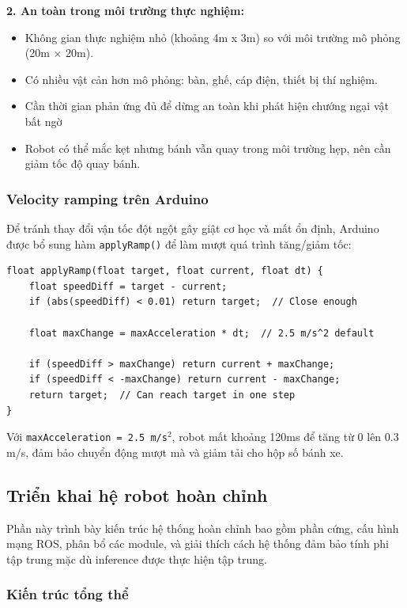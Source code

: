 \textbf{2. An toàn trong môi trường thực nghiệm:}
\begin{itemize}[nosep]
\item Không gian thực nghiệm nhỏ (khoảng 4m x 3m) so với môi trường mô phỏng (20m × 20m).
\item Có nhiều vật cản hơn mô phỏng: bàn, ghế, cáp điện, thiết bị thí nghiệm.
\item Cần thời gian phản ứng đủ để dừng an toàn khi phát hiện chướng ngại vật bất ngờ
\item Robot có thể mắc kẹt nhưng bánh vẫn quay trong môi trường hẹp, nên cần giảm tốc độ quay bánh.
\end{itemize}

\subsubsection{Velocity ramping trên Arduino}

Để tránh thay đổi vận tốc đột ngột gây giật cơ học và mất ổn định, Arduino được bổ sung hàm \texttt{applyRamp()} để làm mượt quá trình tăng/giảm tốc:

\begin{lstlisting}[basicstyle=\ttfamily\small]
float applyRamp(float target, float current, float dt) {
    float speedDiff = target - current;
    if (abs(speedDiff) < 0.01) return target;  // Close enough

    float maxChange = maxAcceleration * dt;  // 2.5 m/s^2 default

    if (speedDiff > maxChange) return current + maxChange;
    if (speedDiff < -maxChange) return current - maxChange;
    return target;  // Can reach target in one step
}
\end{lstlisting}

Với \texttt{maxAcceleration = 2.5 m/s$^2$}, robot mất khoảng 120ms để tăng từ 0 lên 0.3 m/s, đảm bảo chuyển động mượt mà và giảm tải cho hộp số bánh xe.

\subsection{Triển khai hệ robot hoàn chỉnh}
\label{sec:system_deployment}

Phần này trình bày kiến trúc hệ thống hoàn chỉnh bao gồm phần cứng, cấu hình mạng ROS, phân bổ các module, và giải thích cách hệ thống đảm bảo tính phi tập trung mặc dù inference được thực hiện tập trung.

\subsubsection{Kiến trúc tổng thể}

